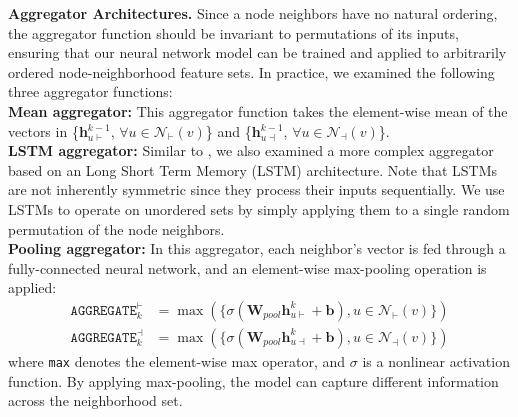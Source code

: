 \documentclass{article} \usepackage{iclr2019_conference,times}
\begin{document}
\textbf{Aggregator Architectures.}
Since a node neighbors have no natural ordering, the aggregator function should
be invariant to permutations of its inputs,  ensuring that our neural network model can
be trained and applied to arbitrarily ordered node-neighborhood feature sets.
In practice, we examined the following three aggregator functions:\\
\textbf{Mean aggregator:} This aggregator function takes the element-wise mean of the vectors in
    \{\textbf{h}$_{u\vdash}^{k-1}$, $\forall u \in \mathcal{N}_{\vdash}(v)$\} and \{\textbf{h}$_{u\dashv}^{k-1}$, $\forall u \in \mathcal{N}_{\dashv}(v)$\}.\\
\textbf{LSTM aggregator:} Similar to \citep{hamilton2017inductive}, we also examined a more complex aggregator based on an Long Short Term Memory (LSTM) architecture. Note that LSTMs are not inherently symmetric since they process their inputs sequentially. We  use LSTMs to operate on unordered sets by simply applying them to a single random permutation of the node neighbors.\\
\textbf{Pooling aggregator:} In this aggregator, each neighbor's vector is fed through a fully-connected neural network, and an element-wise max-pooling operation is applied:\\
    \begin{equation}
    \begin{aligned}
    \texttt{AGGREGATE}_{k}^{\vdash} & = \max(\{\sigma(\textbf{W}_{pool}\textbf{h}_{u\vdash}^{k} + \textbf{b}), u \in \mathcal{N}_{\vdash}(v)\}) \\
    \texttt{AGGREGATE}_{k}^{\dashv} & = \max(\{\sigma(\textbf{W}_{pool}\textbf{h}_{u\dashv}^{k} + \textbf{b}), u \in \mathcal{N}_{\dashv}(v)\})
    \end{aligned}
    \end{equation}
    where \texttt{max} denotes the element-wise max operator, and $\sigma$ is a nonlinear activation function.
    By applying max-pooling, the model can capture different information across the neighborhood set.
\end{document}
